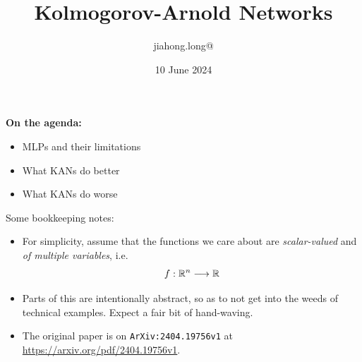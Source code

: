 


\title{\bf Kolmogorov-Arnold Networks}
\author{jiahong.long@}
\date{10 June 2024}



\frame{\titlepage}

\begin{frame}
\end{frame}

\begin{frame}
    \textbf{On the agenda:}
    \begin{itemize}
        \item MLPs and their limitations
        \item What KANs do better
        \item What KANs do worse
    \end{itemize}
\end{frame}

\begin{frame}
    Some bookkeeping notes:
    \begin{itemize}
        \item For simplicity, assume that the functions we care about are
            \textit{scalar-valued} and \textit{of multiple variables}, i.e. 
            \[
                f: \mathbb{R}^n \longrightarrow \mathbb{R}
            \]
        \item Parts of this are intentionally abstract, so as to not get
            into the weeds of technical examples. Expect a fair bit of hand-waving.
        \item The original paper is on \texttt{ArXiv:2404.19756v1}
         at \url{https://arxiv.org/pdf/2404.19756v1}.
    \end{itemize}
\end{frame}

